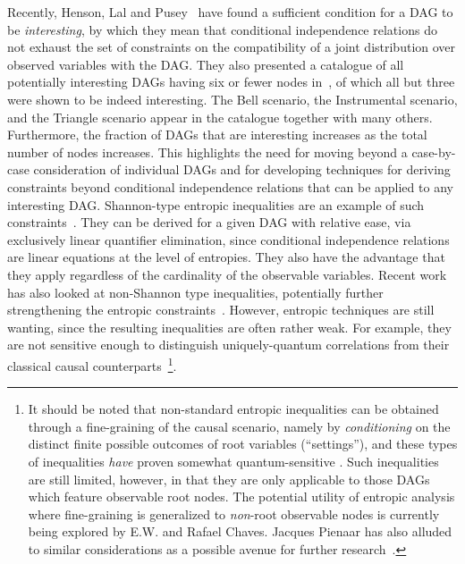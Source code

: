 Recently, Henson, Lal and Pusey~\cite{pusey2014gdag} have found a sufficient condition for a DAG to be {\em interesting}, by which they mean that conditional independence relations do not exhaust the set  of constraints on the compatibility of a joint distribution over observed variables with the DAG. They also presented a catalogue of all potentially interesting DAGs having six or fewer nodes in~\cite[App.~E]{pusey2014gdag}, of which all but three were shown to be indeed interesting. The Bell scenario, the Instrumental scenario, and the Triangle scenario appear in the catalogue together with many others.   Furthermore, the fraction of DAGs that are interesting increases as the total number of nodes increases.  This highlights the need for moving beyond a case-by-case consideration of individual DAGs and for developing techniques for deriving constraints beyond conditional independence relations that can be applied to any interesting DAG. 
Shannon-type entropic inequalities are an example of such constraints~\cite{steudel2010ancestors,fritz2012bell,fritz2013marginal,chaves2014novel,chaves2014informationinference}. They can be derived for a given DAG with relative ease, via exclusively linear quantifier elimination, since conditional independence relations are linear equations at the level of entropies. They also have the advantage that they apply regardless of the cardinality of the observable variables. Recent work has also looked at non-Shannon type inequalities, potentially further strengthening the entropic constraints~\cite{weilenmann2016entropic,pianaar2016interesting}. However, entropic techniques are still wanting, since the resulting inequalities are often rather weak. For example, they are not sensitive enough to \color{red} distinguish uniquely-quantum correlations from their classical causal counterparts\color{black}~\cite{fritz2012bell,weilenmann2016entropic}\footnote{It should be noted that non-standard entropic inequalities can be obtained through a fine-graining of the causal scenario, namely by \emph{conditioning} on the distinct finite possible outcomes of root variables (``settings''), and these types of inequalities \emph{have} proven somewhat quantum-sensitive \cite{braunstein1988entropic,SchumacherInequality,chaves2014novel}. Such inequalities are still limited, however, in that they are only applicable to those DAGs which feature observable root nodes. The potential utility of entropic analysis where fine-graining is generalized to \emph{non}-root observable nodes is currently being explored by E.W. and Rafael Chaves. Jacques Pienaar has also alluded to similar considerations as a possible avenue for further research~\cite{pianaar2016interesting}.}.

